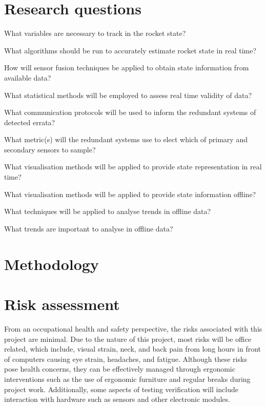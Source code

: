 \section{Research questions}
\begin{questions}
  \item What variables are necessary to track in the rocket state?
  \item What algorithms should be run to accurately estimate rocket state in real time?
  \item How will sensor fusion techniques be applied to obtain state information from available data?
  \item What statistical methods will be employed to assess real time validity of data? \begin{questions}
    \item What communication protocols will be used to inform the redundant systems of detected errata?
    \item What metric(s) will the redundant systems use to elect which of primary and secondary sensors to sample?
  \end{questions}
  \item What visualisation methods will be applied to provide state representation in real time?
  \item What visualisation methods will be applied to provide state information offline? \begin{questions}
    \item What techniques will be applied to analyse trends in offline data? 
    \item What trends are important to analyse in offline data?
  \end{questions}
\end{questions}

\section{Methodology}

\section{Risk assessment}
From an occupational health and safety perspective, the risks associated with this project are minimal. Due to the nature of this project, most risks will be office related, which include, visual strain, neck, and back pain from long hours in front of computers causing eye strain, headaches, and fatigue. Although these risks pose health concerns, they can be effectively managed through ergonomic interventions such as the use of ergonomic furniture and regular breaks during project work. Additionally, some aspects of testing verification will include interaction with hardware such as sensors and other electronic modules. 

